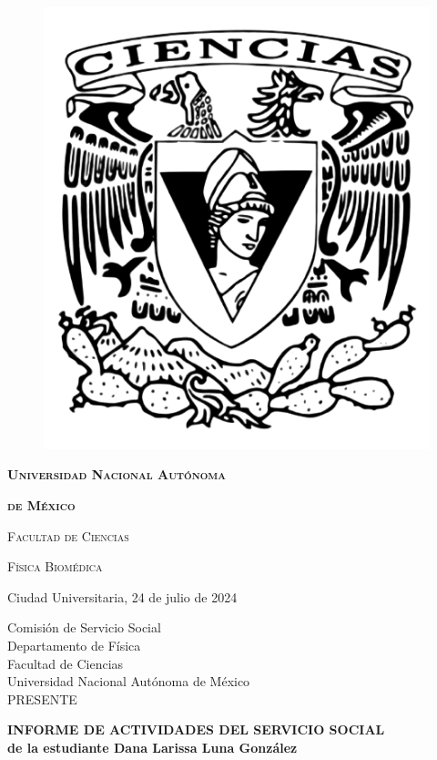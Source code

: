 \documentclass[8.5pt,letterpaper]{article}
\begin{document}
	\begin{figure}[h]
		\begin{center}
			\includegraphics[scale=0.195,bb=-1500 370 40 200]{../../Figuras/image (7)}
		\end{center}
	\end{figure}
	\vspace{-10mm}
	
	\centerline{\Large \textbf{ \textsc{Universidad Nacional Autónoma} }}
	\vspace{2mm}
	\centerline{\Large \textbf{ \textsc{ de México} }}	
	\vspace{3mm}
	\centerline{\large \textsc{Facultad de Ciencias}}
	\vspace{2mm}
	\centerline{\large \textsc{Física Biomédica}}
	\vspace{-5pt}
	\begin{center}\hrulefill
	\end{center}
	\begin{flushright}Ciudad Universitaria, 24 de julio de 2024\end{flushright} 
	
	\begin{flushleft}
		Comisión de Servicio Social\\
		Departamento de Física\\
		Facultad de Ciencias\\
		Universidad Nacional Autónoma de México\\
		PRESENTE
	\end{flushleft} 
	\begin{center}
		\textbf{INFORME DE ACTIVIDADES DEL SERVICIO SOCIAL}\\
		\textbf{de la estudiante Dana Larissa Luna González}
	\end{center}
	
\end{document}
